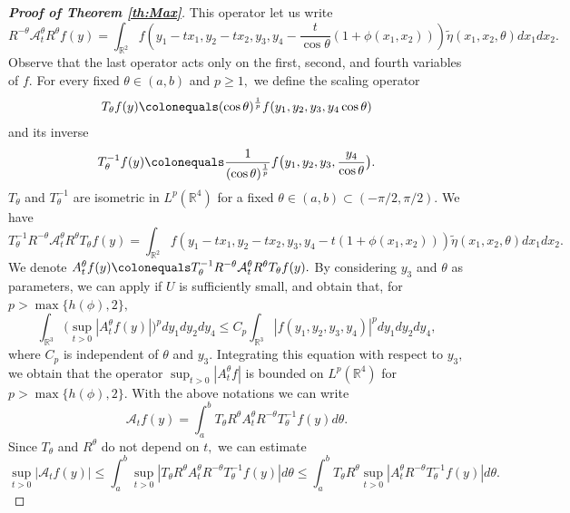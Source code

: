 \documentclass[a4paper, 11pt]{article}
\theoremstyle{plain}
\theoremstyle{definition}
\theoremstyle{lemma}
\theoremstyle{Remark}
\theoremstyle{proposition}
\theoremstyle{corollary}
\theoremstyle{example}
\theoremstyle{assumption}
\begin{document}
\begin{proof}[\textbf{Proof of Theorem \ref{th:Max}}]
This operator let us  write
$$R^{-\theta}\mathcal{A}_t^{\theta}R^{\theta}f(y)=
\int_{\mathbb{R}^2}f(y_1-tx_1,y_2-tx_2,y_3, y_4-\frac{t}{\cos{\theta}}(1+ \phi(x_1,x_2))) \tilde{\eta} (x_1,x_2, \theta)dx_1dx_2.$$
Observe that the last operator acts only on the first, second, and fourth  variables of $f.$
For every fixed $\theta\in (a,b)$ and  $p\geq 1,$ we define the scaling operator
$$T_{\theta}f(y)\colonequals (\cos{\theta})^{\frac{1}{p}}f(y_1,y_2,y_3, y_4\cos{\theta})$$
and its inverse
$$T_{\theta}^{-1}f(y)\colonequals \frac{1}{(\cos{\theta})^{\frac{1}{p}}}f\big(y_1,y_2,y_3, \frac{y_4}{\cos{\theta}}\big).$$
$T_{\theta}$ and  $T_{\theta}^{-1}$ are isometric in $L^p(\mathbb{R}^{4})$ for a fixed $\theta\in (a, b)\subset (-\pi/2, \pi/2)$. We have
$$ T_{\theta}^{-1}R^{-\theta}\mathcal{A}_t^{\theta}R^{\theta}T_{\theta} f(y)=
\int_{\mathbb{R}^2}f(y_1-tx_1,y_2-tx_2,y_3, y_4-t(1+ \phi(x_1,x_2))) \tilde{\eta} (x_1,x_2, \theta)dx_1dx_2.$$
We denote $A^{\theta}_tf(y)\colonequals T_{\theta}^{-1}R^{-\theta}\mathcal{A}_t^{\theta}R^{\theta}T_{\theta} f(y).$
 By considering $y_3$ and $\theta$ as  parameters, we can apply \cite[Theorem 1.3]{I.K.M} if $U$ is sufficiently small, and obtain that, for $p>\max\{h(\phi),2\},$
\begin{equation*}\int_{\mathbb{R}^3}\big(\sup_{t>0}|A^{\theta}_tf(y)| \big)^pdy_1dy_2dy_4\leq C_p \int_{\mathbb{R}^3}|f(y_1,y_2,y_3,y_4)|^pdy_1dy_2dy_4,
\end{equation*}
where $C_p$ is independent of  $\theta$ and $y_3.$
 Integrating this equation with respect to  $y_3,$ we obtain that the operator $\sup_{t>0}|{A}_t^{\theta}f|$ is bounded on $L^p(\mathbb{R}^4)$ for $p> \max\{h(\phi),2\}.$
With the above notations we can write
$$\mathcal{A}_t f(y)=\int_a^b T_{\theta}R^{\theta}{A}_t^{\theta}R^{-\theta}T_{\theta}^{-1} f(y)d\theta.  $$
Since $T_{\theta}$ and $R^{\theta}$ do not depend on $t,$ we can estimate
$$\sup_{t>0}|\mathcal{A}_t f(y)|\leq \int_a^b\sup_{t>0}| T_{\theta}R^{\theta}{A}_t^{\theta}R^{-\theta}T_{\theta}^{-1} f(y)|d\theta\leq \int_a^b T_{\theta}R^{\theta}\sup_{t>0}| {A}_t^{\theta}R^{-\theta}T_{\theta}^{-1} f(y)|d\theta .  $$

\end{proof}
\end{document}
